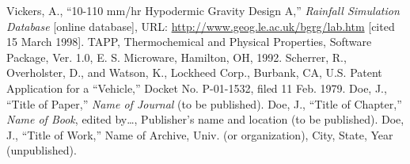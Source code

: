 \documentclass[journal]{aiaa-pretty}
\begin{document}
\begin{thebibliography}{}
 Vickers, A., ``10-110 mm/hr Hypodermic Gravity Design A,'' \textit{Rainfall Simulation Database} [online database], URL: \url{http://www.geog.le.ac.uk/bgrg/lab.htm} [cited 15 March 1998].
 TAPP, Thermochemical and Physical Properties, Software Package, Ver. 1.0, E. S. Microware, Hamilton, OH, 1992.
 Scherrer, R., Overholster, D., and Watson, K., Lockheed Corp., Burbank, CA, U.S. Patent Application for a ``Vehicle,'' Docket No. P-01-1532, filed 11 Feb. 1979.
 Doe, J., ``Title of Paper,'' \textit{Name of Journal} (to be published).
 Doe, J., ``Title of Chapter,'' \textit{Name of Book}, edited by\ldots , Publisher's name and location (to be published).
 Doe, J., ``Title of Work,'' Name of Archive, Univ. (or organization), City, State, Year (unpublished).
\end{thebibliography}
\end{document}
